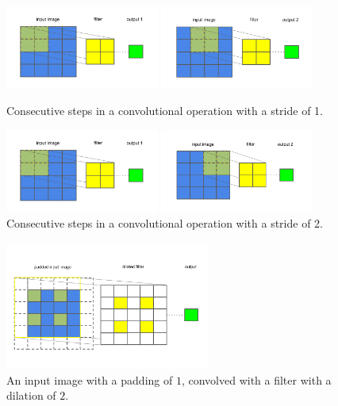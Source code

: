 \begin{figure}[H]
	\parbox{.5\linewidth}{
   		\centering
    		\includegraphics[width=0.45\textwidth, height=0.2\textwidth]{convolution1}
		}
	\hfill
	\parbox{.5\linewidth}{
   		\centering
    		\includegraphics[width=0.45\textwidth, height=0.2\textwidth]{convolution2}
		}
	\captionsetup{justification=centering}
	\caption{Consecutive steps in a convolutional operation with a stride of 1.}
	
	\parbox{.5\linewidth}{
   		\centering
    		\includegraphics[width=0.45\textwidth, height=0.2\textwidth]{convolution1}
		}
	\hfill
	\parbox{.5\linewidth}{
   		\centering
    		\includegraphics[width=0.45\textwidth, height=0.2\textwidth]{stride_of_2}
		}
	\captionsetup{justification=centering}
	\caption{Consecutive steps in a convolutional operation with a stride of 2.}
\end{figure}

\begin{figure}[H]
   	\centering
    	\includegraphics[width=0.6\textwidth, height=0.3\textwidth]{padding_and_dilation}
	\captionsetup{justification=centering}
	\caption{An input image with a padding of $ 1 $, convolved with a filter with a dilation of $ 2 $.}
\end{figure}

